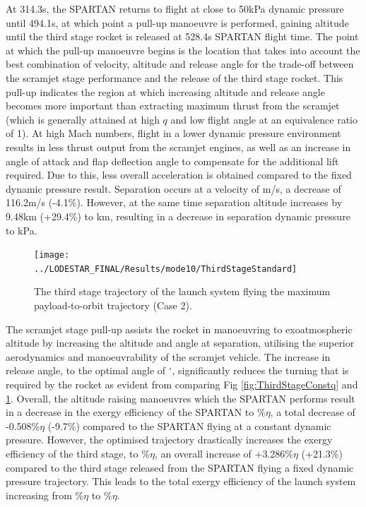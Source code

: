 At 314.3s, the SPARTAN returns to flight at close to 50kPa dynamic pressure until 494.1s, at which point a pull-up manoeuvre is performed, gaining altitude until the third stage rocket is released at 528.4s SPARTAN flight time. 
 The point at which the pull-up manoeuvre begins is the location that takes into account the best combination of velocity, altitude and release angle for the trade-off between the scramjet stage performance and the release of the third stage rocket. This pull-up indicates the region at which increasing altitude and release angle becomes more important than extracting maximum thrust from the scramjet (which is generally attained at high $q$ and low flight angle at an equivalence ratio of 1).
At high Mach numbers, flight in a lower dynamic pressure environment results in less thrust output from the scramjet engines, as well as an increase in angle of attack and flap deflection angle to compensate for the additional lift required. Due to this, less overall acceleration is obtained compared to the fixed dynamic pressure result. Separation occurs at a velocity of \secondthirdSeparationvStandardNoReturn m/s, a decrease of 116.2m/s (-4.1\%). However, at the same time separation altitude increases by 9.48km (+29.4\%) to \secondthirdSeparationAltqStandardNoReturn km, resulting in a decrease in separation dynamic pressure to \secondthirdSeparationqStandardNoReturn kPa. 
\begin{figure}[ht!]
	\centering
	\texttt{[image: ../LODESTAR\_FINAL/Results/mode10/ThirdStageStandard]}
	\caption{The third stage trajectory of the launch system flying the maximum payload-to-orbit trajectory (Case 2).}
	\label{fig:ThirdStageStandardNoReturn}
\end{figure}
The scramjet stage pull-up assists the rocket in manoeuvring to exoatmospheric altitude by increasing the altitude and angle at separation, utilising the superior aerodynamics and manoeuvrability of the scramjet vehicle. The increase in release angle, to the optimal angle of \secondthirdSeparationgammaStandardNoReturn$^\circ$, significantly reduces the turning that is required by the rocket as evident from comparing Fig \ref{fig:ThirdStageConstq} and \ref{fig:ThirdStageStandardNoReturn}. 
Overall, the altitude raising manoeuvres which the SPARTAN performs result in a decrease in the exergy efficiency of the SPARTAN to \secondExergyEffStandardNoReturn\%$\eta$, a total decrease of -0.508\%$\eta$ (-9.7\%) compared to the SPARTAN flying at a constant dynamic pressure. However, the optimised trajectory drastically increases the exergy efficiency of the third stage, to \thirddExergyEffStandardNoReturn\%$\eta$, an overall increase of +3.286\%$\eta$ (+21.3\%) compared to the third stage released from the SPARTAN flying a fixed dynamic pressure trajectory.  
This leads to the total exergy efficiency of the launch system increasing from \totalExergyEffConstqNoReturn\%$\eta$ to \totalExergyEffStandardNoReturn\%$\eta$. 

